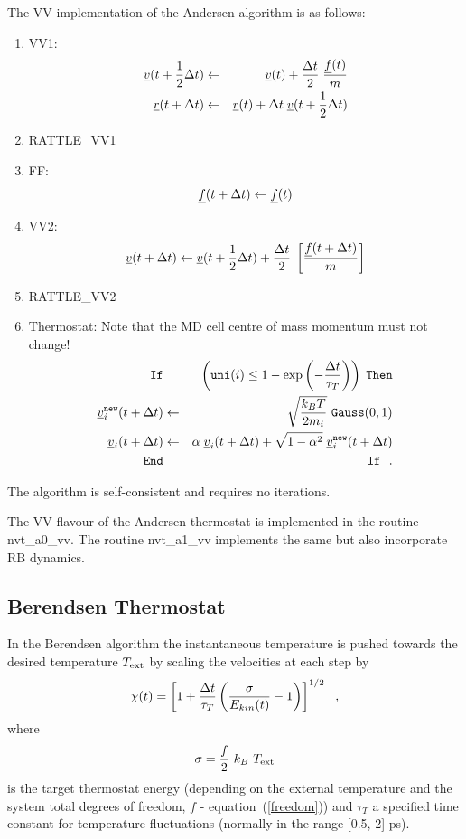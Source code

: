 The VV implementation of the Andersen algorithm is as follows:
\begin{enumerate}
\item VV1:
\begin{eqnarray}
\mbox{$\underline{v}$}(t + {1 \over 2} \Delta t) &\leftarrow& \mbox{$\underline{v}$}(t) +
{\Delta t \over 2} \; {\mbox{$\underline{f}$}(t) \over m} \nonumber \\
\mbox{$\underline{r}$}(t + \Delta t) &\leftarrow& \mbox{$\underline{r}$}(t) + \Delta t \;
\mbox{$\underline{v}$}(t + {1 \over 2} \Delta t)
\end{eqnarray}
\item RATTLE\_VV1
\item FF:
\begin{equation}
\mbox{$\underline{f}$}(t + \Delta t) \leftarrow \mbox{$\underline{f}$}(t)
\end{equation}
\item VV2:
\begin{equation}
\mbox{$\underline{v}$}(t + \Delta t) \leftarrow \mbox{$\underline{v}$}(t + {1 \over 2} \Delta t) +
{\Delta t \over 2} \; \left[{\mbox{$\underline{f}$}(t + \Delta t) \over m} \right]
\end{equation}
\item RATTLE\_VV2
\item Thermostat: Note that the MD cell centre of mass momentum must not change!
\begin{eqnarray}
{\tt If} && \left({\tt uni}(i) \le 1 - \exp \left(-\frac{\Delta t}{\tau_{T}}\right) \right)
\; {\tt Then} \nonumber \\
\mbox{$\underline{v}$}_{i}^{\tt new}(t + \Delta t) &\leftarrow&
\sqrt{\frac{k_{B}T}{2 m_{i}}}~{\tt Gauss}(0,1) \\
\mbox{$\underline{v}$}_{i}(t + \Delta t) &\leftarrow& \alpha \; \mbox{$\underline{v}$}_{i}(t + \Delta t) +
\sqrt{1-\alpha^{2}} \; \mbox{$\underline{v}$}_{i}^{\tt new}(t + \Delta t) \nonumber \\
{\tt End} && {\tt If}~~.\nonumber
\end{eqnarray}
\end{enumerate}
The algorithm is self-consistent and requires no iterations.

The VV flavour of the Andersen thermostat is implemented in
the \D routine {\sc nvt\_a0\_vv}.
The routine {\sc nvt\_a1\_vv} implements the
same but also incorporate RB dynamics.

\subsection{Berendsen Thermostat}

In the Berendsen algorithm the instantaneous temperature is pushed
towards the desired temperature $T_{\rm ext}$ by scaling the
velocities at each step by
\begin{equation}
\chi (t) = \left[ 1 + {\Delta t \over \tau_{T}} \left(
{\sigma \over E_{kin}(t)} - 1 \right) \right]^{1/2}~~,
\end{equation}
where
\begin{equation}
\sigma = \frac{f}{2}~k_{B}~T_{\rm ext} \label{sigma}
\end{equation}
is the target thermostat energy (depending on the external
temperature and the system total degrees of freedom, $f$ -
equation~(\ref{freedom})) and $\tau_{T}$ a specified time constant
for temperature fluctuations (normally in the range [0.5, 2] ps).

